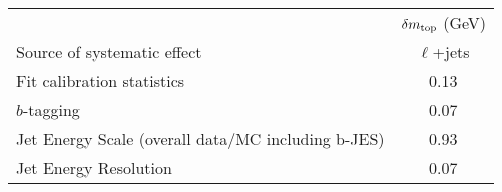 \begin{table}[!htp]
\begin{center}
\begin{tabular}{l|c}
\hline\hline
                                   & $\delta m_{\rm top}$ (GeV)  \\
Source of systematic effect        & $\ell$+jets\\
\hline
Fit calibration statistics         & 0.13 \\
$b$-tagging                        & 0.07 \\
Jet Energy Scale (overall data/MC including b-JES) & 0.93 \\
Jet Energy Resolution              & 0.07  \\

\end{tabular}
\end{center}
\end{table}
